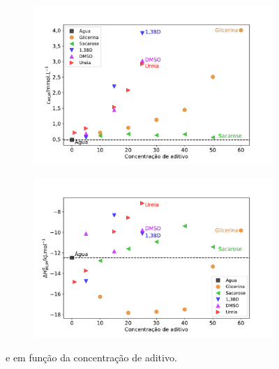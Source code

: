 			\begin{figure}[h]
				\begin{subfigure}[t]{0.5\textwidth}
					\centering
					\includegraphics[width=\textwidth]{imagens/itc/Cwlm_por_conc}
					\caption{\cwlm}
					\label{fig:cwlm_por_conc}
				\end{subfigure} %
				\begin{subfigure}[t]{0.5\textwidth}
					\centering
					\includegraphics[width=\textwidth]{imagens/itc/DHwlm_por_conc}
					\caption{\DHwlm}
					\label{fig:dhwlm_por_conc}
				\end{subfigure}
				
				\caption{\cmc{} e \DHmic{} em função da concentração de aditivo.}
				\label{fig:cwlm_dhwlm_por_conc}
			\end{figure}



		
		\FloatBarrier
		
